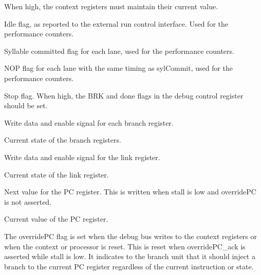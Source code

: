\ifaceSubGroup{}
When high, the context registers must maintain their current value.

\ifaceSubGroup{}
Idle flag, as reported to the external run control interface. Used for the 
performance counters.

\ifaceSubGroup{}
Syllable committed flag for each lane, used for the performance counters.
    
\ifaceSubGroup{}
NOP flag for each lane with the same timing as sylCommit, used for the 
performance counters.

\ifaceSubGroup{}
Stop flag. When high, the BRK and done flags in the debug control
register should be set.
    
\ifaceSubGroup{}
Write data and enable signal for each branch register.
    
\ifaceSubGroup{}
Current state of the branch registers.
    
\ifaceSubGroup{}
Write data and enable signal for the link register.
    
\ifaceSubGroup{}
Current state of the link register.

\ifaceSubGroup{}
Next value for the PC register. This is written when stall is low and overridePC 
is not asserted.

\ifaceSubGroup{}
Current value of the PC register.

\ifaceSubGroup{}
The overridePC flag is set when the debug bus writes to the context registers or 
when the context or processor is reset. This is reset when overridePC_ack is 
asserted while stall is low. It indicates to the branch unit that it should 
inject a branch to the current PC register regardless of the current instruction 
or state.

